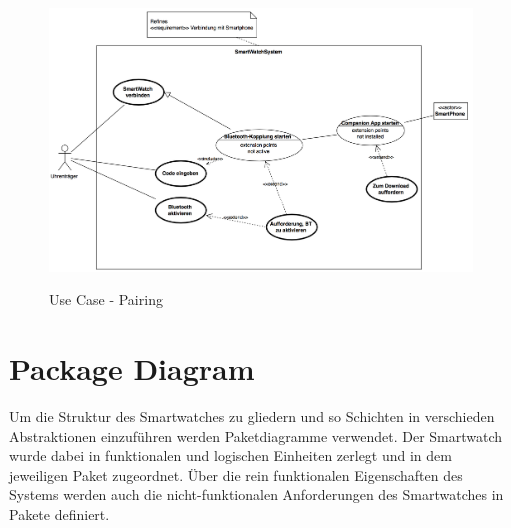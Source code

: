 \begin{figure}[H]
\centering\
\includegraphics[width=14cm]{img/usecase-pairing-p1}
\caption{Use Case - Pairing}\label{fig:usecase-pairing-p1}
\end{figure}



\section{Package Diagram}
Um die Struktur des Smartwatches zu gliedern und so Schichten in verschieden Abstraktionen
einzuführen werden Paketdiagramme verwendet.
Der Smartwatch wurde dabei in funktionalen und logischen Einheiten zerlegt und in dem jeweiligen Paket zugeordnet.
Über die rein funktionalen Eigenschaften des Systems werden auch die nicht-funktionalen Anforderungen des Smartwatches in Pakete definiert.



